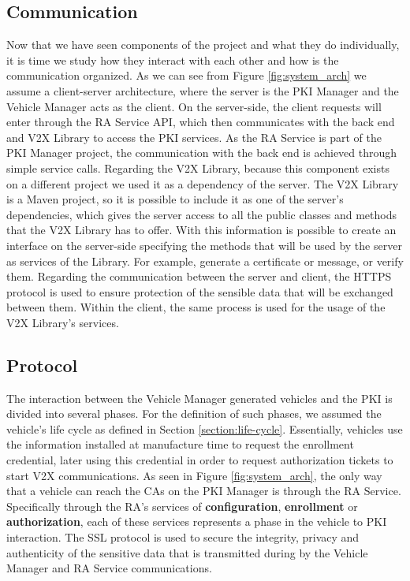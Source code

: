 \subsection{Communication}
Now that we have seen components of the project and what they do individually, it is time we study how they interact with each other and how is the communication organized. 
As we can see from Figure \ref{fig:system_arch} we assume a client-server architecture, where the server is the PKI Manager and the Vehicle Manager acts as the client. On the server-side, the client requests will enter through the RA Service API, which then communicates with the back end and V2X Library to access the PKI services. As the RA Service is part of the PKI Manager project, the communication with the back end is achieved through simple service calls. Regarding the V2X Library, because this component exists on a different project we used it as a dependency of the server. The V2X Library is a Maven project, so it is possible to include it as one of the server's dependencies, which gives the server access to all the public classes and methods that the V2X Library has to offer. With this information is possible to create an interface on the server-side specifying the methods that will be used by the server as services of the Library. For example, generate a certificate or message, or verify them. Regarding the communication between the server and client, the HTTPS protocol is used to ensure protection of the sensible data that will be exchanged between them. Within the client, the same process is used for the usage of the V2X Library's services.



\subsection{Protocol} \label{protocol}
The interaction between the Vehicle Manager generated vehicles and the PKI is divided into several phases. For the definition of such phases, we assumed the vehicle's life cycle as defined in Section \ref{section:life-cycle}. Essentially, vehicles use the information installed at manufacture time to request the enrollment credential, later using this credential in order to request authorization tickets to start V2X communications. As seen in Figure \ref{fig:system_arch}, the only way that a vehicle can reach the CAs on the PKI Manager is through the RA Service. Specifically through the RA's services of \textbf{configuration}, \textbf{enrollment} or \textbf{authorization}, each of these services represents a phase in the vehicle to PKI interaction. The SSL protocol is used to secure the integrity, privacy and authenticity of the sensitive data that is transmitted during by the Vehicle Manager and RA Service communications.



